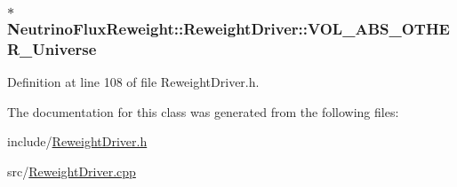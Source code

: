 \hypertarget{class_neutrino_flux_reweight_1_1_reweight_driver_aa1f1b8ea148bd3fff48b157ab415a024}{
\subsubsection[{V\-O\-L\-\_\-\-A\-B\-S\-\_\-\-O\-T\-H\-E\-R\-\_\-\-Universe}]{$\ast$ Neutrino\-Flux\-Reweight\-::\-Reweight\-Driver\-::\-V\-O\-L\-\_\-\-A\-B\-S\-\_\-\-O\-T\-H\-E\-R\-\_\-\-Universe}}\label{class_neutrino_flux_reweight_1_1_reweight_driver_aa1f1b8ea148bd3fff48b157ab415a024}


Definition at line 108 of file Reweight\-Driver.\-h.



The documentation for this class was generated from the following files\-:\begin{DoxyCompactItemize}
\item 
include/\hyperlink{_reweight_driver_8h}{Reweight\-Driver.\-h}\item 
src/\hyperlink{_reweight_driver_8cpp}{Reweight\-Driver.\-cpp}\end{DoxyCompactItemize}
